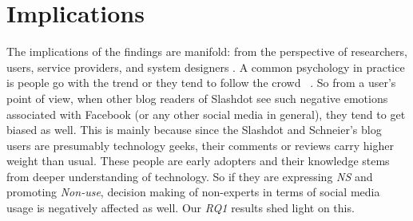\section{Implications}
\label{sec:implications}
The implications of the findings are manifold: from the perspective of researchers, users, service providers, and system designers \cite{baumer2015importance}. A common psychology in practice is people go with the trend or they tend to follow the crowd ~\cite{gilbert2009blogs}. So from a user's point of view, when other blog readers of Slashdot see such negative emotions associated with Facebook (or any other social media in general), they tend to get biased as well. This is mainly because since the Slashdot and Schneier's blog users are presumably technology geeks, their comments or reviews carry higher weight than usual. These people are early adopters and their knowledge stems from deeper understanding of technology. So if they are expressing \emph{NS} and promoting \textit{Non-use}, decision making of non-experts in terms of social media usage is negatively affected as well. Our \textit{RQ1} results shed light on this. 


